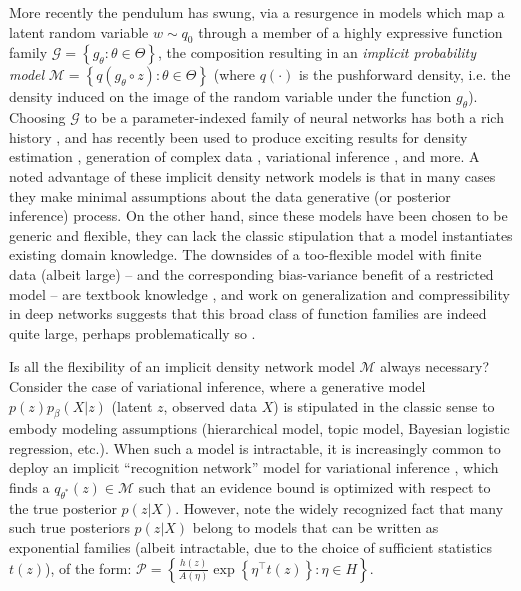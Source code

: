 \documentclass{article}
\begin{document}
More recently the pendulum has swung, via a resurgence in models which map a latent random variable $w\sim q_0$ through a member of a highly expressive function family $\mathcal{G} = \left\{g_\theta : \theta \in \Theta\right\}$, the composition resulting in an \emph{implicit probability model} $\mathcal{M} = \left\{ q(g_\theta \circ z) : \theta \in \Theta \right\}$ (where $q(\cdot)$ is the pushforward density, i.e. the density induced on the image of the random variable under the function $g_\theta$).  
Choosing $\mathcal{G}$ to be a parameter-indexed family of neural networks has both a rich history \cite{dayan1995helmholtz,mackay1997density}, and has recently been used to produce exciting results for density estimation \cite{uria2013rnade, rippel2013high, papamakarios2017masked}, generation of complex data \cite{Goodfellow:2014aa}, variational inference \cite{Kingma:2013aa, rezende2014stochastic, titsias2014doubly}, and more.  
A noted advantage of these implicit density network models is that in many cases they make minimal assumptions about the data generative (or posterior inference) process.  
On the other hand, since these models have been chosen to be generic and flexible, they can lack the classic stipulation that a model instantiates existing domain knowledge.  
The downsides of a too-flexible model with finite data (albeit large) -- and the corresponding bias-variance benefit of a restricted model -- are textbook knowledge \cite[\S 7.3]{friedman2001elements}, and work on generalization and compressibility in deep networks suggests that this broad class of function families are indeed quite large, perhaps problematically so \cite{zhou2018compressibility}.  

Is all the flexibility of an implicit density network model $\mathcal{M}$ always necessary?  
Consider the case of variational inference, where a generative model $p(z)p_\beta(X | z)$ (latent $z$, observed data $X$) is stipulated in the classic sense to embody modeling assumptions (hierarchical model, topic model, Bayesian logistic regression, etc.).  
When such a model is intractable, it is increasingly common to deploy an implicit ``recognition network'' model for variational inference \cite{Kingma:2013aa}, which finds a $q_{\theta^*}(z) \in \mathcal{M}$ such that an evidence bound is optimized with respect to the true posterior $p(z|X)$.  
However, note the widely recognized fact \cite{wainwright2008graphical} that many such true posteriors $p(z|X)$ belong to models that can be written as exponential families (albeit intractable, due to the choice of sufficient statistics $t(z)$), of the form: $\mathcal{P} = \left\{ \frac{h(z)}{A(\eta)} \exp\left\{ \eta^\top t(z) \right \} : \eta \in H \right\}$.
\end{document}
